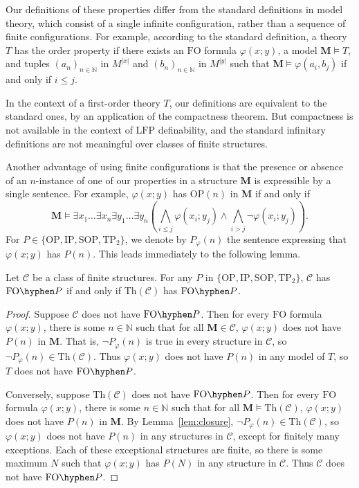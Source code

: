 \documentclass{lmcs}
\newcommand{\Th}{\mathrm{Th}}
\newcommand{\LFP}{\mathrm{LFP}}
\newcommand{\FO}{\mathrm{FO}}
\newcommand{\FOP}[1]{\FO\hyphen#1}
\newcommand{\OP}{\mathrm{OP}}
\newcommand{\IP}{\mathrm{IP}}
\newcommand{\SOP}{\mathrm{SOP}}
\newcommand{\TPT}{\mathrm{TP}_2}
\newcommand{\M}{\mathbf{M}}
\theoremstyle{thmC}
\begin{document}
\begin{rem}
Our definitions of these properties differ from the standard definitions in model theory, which consist of a single infinite configuration, rather than a sequence of finite configurations. For example, according to the standard definition, a theory $T$ has the order property if there exists an $\FO$ formula $\varphi(x;y)$, a model $\M\models T$, and tuples $(a_n)_{n\in \mathbb{N}}$ in $M^{|x|}$ and $(b_n)_{n\in \mathbb{N}}$ in $M^{|y|}$ such that $\M\models \varphi(a_i,b_j)$ if and only if $i\leq j$. 

In the context of a first-order theory $T$, our definitions are equivalent to the standard ones, by an application of the compactness theorem. But compactness is not available in the context of $\LFP$ definability, and the standard infinitary definitions are not meaningful over classes of finite structures. 

Another advantage of using finite configurations is that the presence or absence of an $n$-instance of one of our properties in a structure $\M$ is expressible by a single sentence. For example, $\varphi(x;y)$ has $\OP(n)$ in $\M$ if and only if \[\M \models \exists x_1\dots \exists x_n \exists y_1\dots \exists y_n \left(\bigwedge_{i\leq j} \varphi(x_i;y_j)\land \bigwedge_{i>j} \lnot \varphi(x_i;y_j)\right).\] For $P\in \{\OP,\IP,\SOP,\TPT\}$, we denote by $P_\varphi(n)$ the sentence expressing that $\varphi(x;y)$ has $P(n)$. This leads immediately to the following lemma.
\end{rem}

\begin{lem}\label{lem:FO-P passage}
Let $\mathcal{C}$ be a class of finite structures. For any $P$ in $\{\OP, \IP, \SOP, \TPT\}$, $\mathcal{C}$ has $\FOP{P}$ if and only if $\Th(\mathcal{C})$ has $\FOP{P}$. 
\end{lem}
\begin{proof}
Suppose $\mathcal{C}$ does not have $\FOP{P}$. Then for every $\FO$ formula $\varphi(x;y)$, there is some $n\in \mathbb{N}$ such that for all $\M\in \mathcal{C}$, $\varphi(x;y)$ does not have $P(n)$ in $\M$. That is, $\lnot P_\varphi(n)$ is true in every structure in $\mathcal{C}$, so $\lnot P_\varphi(n)\in \Th(\mathcal{C})$. Thus $\varphi(x;y)$ does not have $P(n)$ in any model of $T$, so $T$ does not have $\FOP{P}$. 

Conversely, suppose $\Th(\mathcal{C})$ does not have $\FOP{P}$. Then for every $\FO$ formula $\varphi(x;y)$, there is some $n\in \mathbb{N}$ such that for all $\M\models \Th(\mathcal{C})$, $\varphi(x;y)$ does not have $P(n)$ in $\M$. By Lemma~\ref{lem:closure}, $\lnot P_\varphi(n)\in \Th(\mathcal{C})$, so $\varphi(x;y)$ does not have $P(n)$ in any structures in $\mathcal{C}$, except for finitely many exceptions. Each of these exceptional structures are finite, so there is some maximum $N$ such that $\varphi(x;y)$ has $P(N)$ in any structure in $\mathcal{C}$. Thus $\mathcal{C}$ does not have $\FOP{P}$.
\end{proof}
\end{document}
